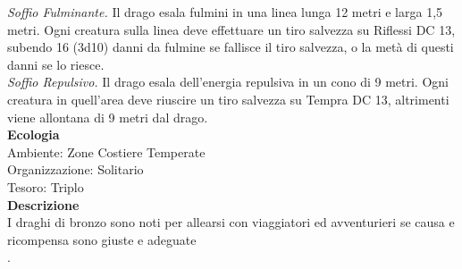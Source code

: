 \begin{multicols}{2}
\emph{Soffio Fulminante.} Il drago esala fulmini in una linea lunga 12 metri e larga 1,5 metri. Ogni creatura sulla linea deve effettuare un tiro salvezza su Riflessi DC  13, subendo 16 (3d10) danni da fulmine se fallisce il tiro salvezza, o la metà di questi danni se lo riesce.\\
\emph{Soffio Repulsivo.} Il drago esala dell'energia repulsiva in un cono di 9 metri. Ogni creatura in quell'area deve riuscire un tiro salvezza su Tempra DC  13, altrimenti viene allontana di 9 metri dal drago.\\
\textbf{Ecologia}\\
Ambiente: Zone Costiere Temperate\\
Organizzazione: Solitario\\
Tesoro: Triplo\\
\textbf{Descrizione}\\
I draghi di bronzo sono noti per allearsi con viaggiatori ed avventurieri se causa e ricompensa sono giuste e adeguate\\
.


\end{multicols}
